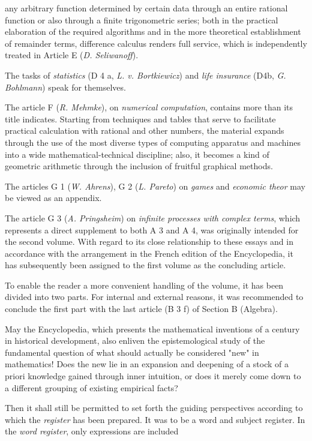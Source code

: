 \thispagestyle{fancy}

\vspace{0.5cm}

any arbitrary function determined by certain data through an entire rational function or also through a finite trigonometric series; both in the practical elaboration of the required algorithms and in the more theoretical establishment of remainder terms, difference calculus renders full service, which is independently treated in Article E (\textit{D. Seliwanoff}).

The tasks of \textit{statistics} (D 4 a, \textit{L. v. Bortkiewicz}) and \textit{life insurance} (D4b, \textit{G. Bohlmann}) speak for themselves.

The article F (\textit{R. Mehmke}), on \textit{numerical computation}, contains more than its title indicates. Starting from techniques and tables that serve to facilitate practical calculation with rational and other numbers, the material expands through the use of the most diverse types of computing apparatus and machines into a wide mathematical-technical discipline; also, it becomes a kind of geometric arithmetic through the inclusion of fruitful graphical methods.

The articles G 1 (\textit{W. Ahrens}), G 2 (\textit{L. Pareto}) on \textit{games} and \textit{economic theor} may be viewed as an appendix.

The article G 3 (\textit{A. Pringsheim}) on \textit{infinite processes with complex terms}, which represents a direct supplement to both A 3 and A 4, was originally intended for the second volume. With regard to its close relationship to these essays and in accordance with the arrangement in the French edition of the Encyclopedia, it has subsequently been assigned to the first volume as the concluding article.

To enable the reader a more convenient handling of the volume, it has been divided into two parts. For internal and external reasons, it was recommended to conclude the first part with the last article (B 3 f) of Section B (Algebra).

May the Encyclopedia, which presents the mathematical inventions of a century in historical development, also enliven the epistemological study of the fundamental question of what should actually be considered "new" in mathematics! Does the new lie in an expansion and deepening of a stock of a priori knowledge gained through inner intuition, or does it merely come down to a different grouping of existing empirical facts?

Then it shall still be permitted to set forth the guiding perspectives according to which the \textit{register} has been prepared. It was to be a word and subject register. In the \textit{word register}, only expressions are included
